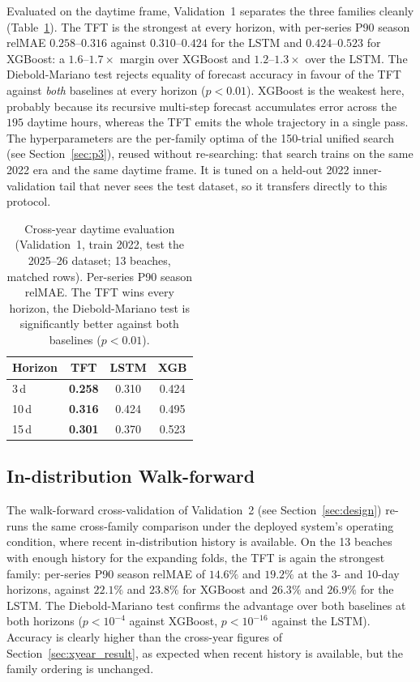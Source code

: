\documentclass[twocolumn,twoside,a4paper,10pt]{IEEEtran}
\begin{document}
Evaluated on the daytime frame, Validation~1 separates the three families cleanly (Table~\ref{tab:daytime}). The TFT is the strongest at every horizon, with per-series P90 season relMAE $0.258$--$0.316$ against $0.310$--$0.424$ for the LSTM and $0.424$--$0.523$ for XGBoost: a $1.6$--$1.7\times$ margin over XGBoost and $1.2$--$1.3\times$ over the LSTM. The Diebold-Mariano test rejects equality of forecast accuracy in favour of the TFT against \emph{both} baselines at every horizon ($p<0.01$). XGBoost is the weakest here, probably because its recursive multi-step forecast accumulates error across the $195$ daytime hours, whereas the TFT emits the whole trajectory in a single pass. The hyperparameters are the per-family optima of the 150-trial unified search (see Section~\ref{sec:p3}), reused without re-searching: that search trains on the same 2022 era and the same daytime frame. It is tuned on a held-out 2022 inner-validation tail that never sees the test dataset, so it transfers directly to this protocol.

\begin{table}[!t]
    \caption{Cross-year daytime evaluation (Validation~1, train 2022, test the 2025--26 dataset; 13 beaches, matched rows). Per-series P90 season relMAE. The TFT wins every horizon, the Diebold-Mariano test is significantly better against both baselines ($p<0.01$).}
    \label{tab:daytime}
    \begin{center}
    \footnotesize
    \begin{tabular}{lccc}
        \toprule
        Horizon & TFT & LSTM & XGB \\
        \midrule
        3\,d  & \textbf{0.258} & 0.310 & 0.424 \\
        10\,d & \textbf{0.316} & 0.424 & 0.495 \\
        15\,d & \textbf{0.301} & 0.370 & 0.523 \\
        \bottomrule
    \end{tabular}
    \end{center}
\end{table}

\subsection{In-distribution Walk-forward}\label{sec:walkforward_result}

The walk-forward cross-validation of Validation~2 (see Section~\ref{sec:design}) re-runs the same cross-family comparison under the deployed system's operating condition, where recent in-distribution history is available. On the 13 beaches with enough history for the expanding folds, the TFT is again the strongest family: per-series P90 season relMAE of $14.6\%$ and $19.2\%$ at the 3- and 10-day horizons, against $22.1\%$ and $23.8\%$ for XGBoost and $26.3\%$ and $26.9\%$ for the LSTM. The Diebold-Mariano test confirms the advantage over both baselines at both horizons ($p<10^{-4}$ against XGBoost, $p<10^{-16}$ against the LSTM). Accuracy is clearly higher than the cross-year figures of Section~\ref{sec:xyear_result}, as expected when recent history is available, but the family ordering is unchanged.
\end{document}
